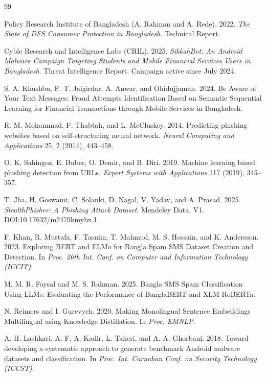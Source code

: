 \documentclass[manuscript,screen,review]{acmart}
\begin{document}

\begin{thebibliography}{99}

 Policy Research Institute of Bangladesh (A. Rahman and A. Rede). 2022. \emph{The State of DFS Consumer Protection in Bangladesh}. Technical Report.

 Cyble Research and Intelligence Labs (CRIL). 2025. \emph{SikkahBot: An Android Malware Campaign Targeting Students and Mobile Financial Services Users in Bangladesh}. Threat Intelligence Report. Campaign active since July 2024.

 S. A. Khushbu, F. T. Jaigirdar, A. Anwar, and Ohidujjaman. 2024. Be Aware of Your Text Messages: Fraud Attempts Identification Based on Semantic Sequential Learning for Financial Transactions through Mobile Services in Bangladesh.

 R. M. Mohammad, F. Thabtah, and L. McCluskey. 2014. Predicting phishing websites based on self-structuring neural network. \emph{Neural Computing and Applications} 25, 2 (2014), 443--458.

 O. K. Sahingoz, E. Buber, O. Demir, and B. Diri. 2019. Machine learning based phishing detection from URLs. \emph{Expert Systems with Applications} 117 (2019), 345--357.

 T. Jha, H. Goswami, C. Solanki, D. Nagal, V. Yadav, and A. Prasad. 2025. \emph{StealthPhisher: A Phishing Attack Dataset}. Mendeley Data, V1. DOI:10.17632/m2479kmybx.1.

 F. Khan, R. Mustafa, F. Tasnim, T. Mahmud, M. S. Hossain, and K. Andersson. 2023. Exploring BERT and ELMo for Bangla Spam SMS Dataset Creation and Detection. In \emph{Proc. 26th Int. Conf. on Computer and Information Technology (ICCIT)}.

 M. M. R. Foysal and M. S. Rahman. 2025. Bangla SMS Spam Classification Using LLMs: Evaluating the Performance of BanglaBERT and XLM-RoBERTa.

 N. Reimers and I. Gurevych. 2020. Making Monolingual Sentence Embeddings Multilingual using Knowledge Distillation. In \emph{Proc. EMNLP}.

 A. H. Lashkari, A. F. A. Kadir, L. Taheri, and A. A. Ghorbani. 2018. Toward developing a systematic approach to generate benchmark Android malware datasets and classification. In \emph{Proc. Int. Carnahan Conf. on Security Technology (ICCST)}.


\end{thebibliography}
\end{document}
